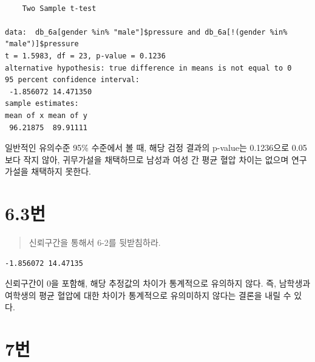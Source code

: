 \documentclass[
  letterpaper,
  DIV=11,
  numbers=noendperiod]{scrreprt}
\newenvironment{Shaded}{\begin{snugshade}}{\end{snugshade}}
\newcommand{\AttributeTok}[1]{\textcolor[rgb]{0.40,0.45,0.13}{#1}}
\newcommand{\ConstantTok}[1]{\textcolor[rgb]{0.56,0.35,0.01}{#1}}
\newcommand{\FunctionTok}[1]{\textcolor[rgb]{0.28,0.35,0.67}{#1}}
\newcommand{\NormalTok}[1]{\textcolor[rgb]{0.00,0.23,0.31}{#1}}
\newcommand{\SpecialCharTok}[1]{\textcolor[rgb]{0.37,0.37,0.37}{#1}}
\newcommand{\StringTok}[1]{\textcolor[rgb]{0.13,0.47,0.30}{#1}}
\begin{document}
\begin{verbatim}

    Two Sample t-test

data:  db_6a[gender %in% "male"]$pressure and db_6a[!(gender %in% "male")]$pressure
t = 1.5983, df = 23, p-value = 0.1236
alternative hypothesis: true difference in means is not equal to 0
95 percent confidence interval:
 -1.856072 14.471350
sample estimates:
mean of x mean of y 
 96.21875  89.91111 
\end{verbatim}

일반적인 유의수준 95\% 수준에서 볼 때, 해당 검정 결과의 p-value는
0.1236으로 0.05보다 작지 않아, 귀무가설을 채택하므로 남성과 여성 간 평균
혈압 차이는 없으며 연구가설을 채택하지 못한다.

\hypertarget{uxbc88-35}{%
\chapter*{6.3번}\label{uxbc88-35}}


\begin{quote}
신뢰구간을 통해서 6-2를 뒷받침하라.
\end{quote}

\begin{Shaded}
\end{Shaded}

\begin{verbatim}
-1.856072 14.47135
\end{verbatim}

신뢰구간이 0을 포함해, 해당 추정값의 차이가 통계적으로 유의하지 않다.
즉, 남학생과 여학생의 평균 혈압에 대한 차이가 통계적으로 유의미하지
않다는 결론을 내릴 수 있다.

\hypertarget{uxbc88-36}{%
\chapter*{7번}\label{uxbc88-36}}
\end{document}
